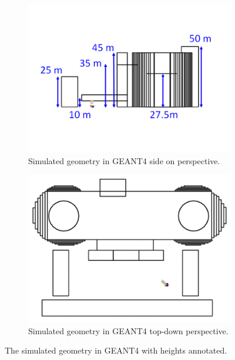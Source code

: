 \begin{figure}[htbp]
\centering
\begin{subfigure}{.5\textwidth}
  \centering
  \includegraphics[width=\linewidth]{Chapter5/Figs/wylfaRasterNew/WylfaSimGeomSideOn.png}
  \captionsetup{width=.9\linewidth}
  \caption{Simulated geometry in GEANT4 side on perspective.}
  \label{subFig:WylfaSimGeomSideOn}
\end{subfigure}%
\begin{subfigure}{.5\textwidth}
  \centering
\includegraphics[width=\linewidth]{Chapter5/Figs/wylfaRasterNew/WylfaSimGeomTopDown.png}
  \captionsetup{width=.9\linewidth}
  \caption{Simulated geometry in GEANT4 top-down perspective.}
  \label{subFig:WylfaSimGeomTopDown}
\end{subfigure}
\caption{The simulated geometry in GEANT4 with heights annotated.}
\label{fig:WylfaSimGeom_SideOn_TopDown}
\end{figure}

